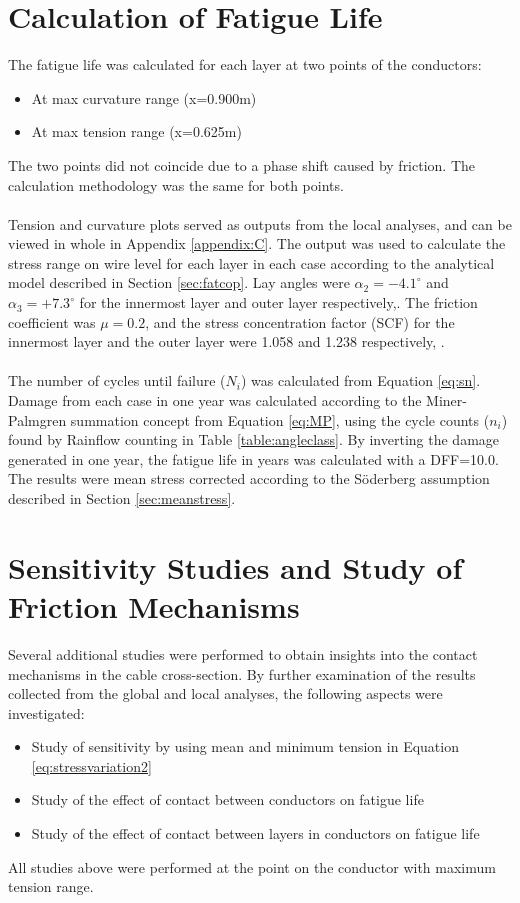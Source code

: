\section{Calculation of Fatigue Life}
\label{sec:fatiguelife}
 The fatigue life was calculated for each layer at two points of the conductors: 
\begin{itemize}
\item At max curvature range (x=0.900m)
\item At max tension range  (x=0.625m)
\end{itemize}
The two points did not coincide due to a phase shift caused by friction. The calculation methodology was the same for both points.  \\\\ Tension and curvature plots served as outputs from the local analyses, and can be viewed in whole in Appendix \ref{appendix:C}. The output was used to calculate the stress range on wire level for each layer in each case according to the analytical model described in Section \ref{sec:fatcop}. Lay angles were $\alpha_2=-4.1^\circ$ and $\alpha_3=+7.3^\circ$ for the innermost layer and outer layer respectively,\cite{Nasution2013}. The friction coefficient was  $\mu=0.2$, and the stress concentration factor (SCF) for the innermost layer and the outer layer were 1.058 and 1.238 respectively, \cite{NASUTION2014}.\\\\
The number of cycles until failure ($N_i$) was calculated from Equation \ref{eq:sn}. Damage from each case in one year was calculated according to the Miner-Palmgren summation concept from Equation \ref{eq:MP}, using the cycle counts ($n_i$) found by Rainflow counting in Table \ref{table:angleclass}. By inverting the damage generated in one year, the fatigue life in years was calculated with a DFF=10.0. The results were mean stress corrected according to the Söderberg assumption described in Section \ref{sec:meanstress}. 

\section{Sensitivity Studies and Study of Friction Mechanisms}
Several additional studies were performed to obtain insights into the contact mechanisms in the cable cross-section. By further examination of the results collected from the global and local analyses, the following aspects were investigated:
\begin{itemize}
    \item Study of sensitivity by using mean and minimum tension in Equation \ref{eq:stressvariation2}
    \item Study of the effect of contact between conductors on fatigue life
    \item Study of the effect of contact between layers in conductors on fatigue life
\end{itemize}
All studies above were performed at the point on the conductor with maximum tension range.
